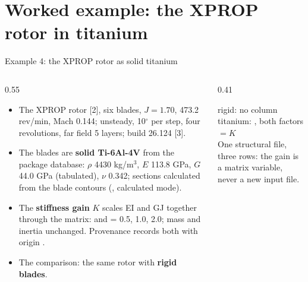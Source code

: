 %
%
%
%

\section{Worked example: the XPROP rotor in titanium}

\begin{frame}{Example 4: the XPROP rotor as solid titanium}
\begin{columns}[T]
\begin{column}{0.55\textwidth}
\begin{itemize}\scriptsize
  \item The XPROP rotor [2], six blades, \(J = 1.70\), 473.2 rev/min,
        Mach 0.144; unsteady, 10\(^\circ\) per step, four revolutions, far field
        5 layers; build 26.124 [3].
  \item The blades are \textbf{solid Ti-6Al-4V} from the package database:
        \(\rho\) 4430 kg/m\(^3\), \(E\) 113.8 GPa, \(G\) 44.0 GPa (tabulated),
        \(\nu\) 0.342; sections calculated from the blade contours
        (, calculated mode).
  \item The \textbf{stiffness gain} \(K\) scales EI and GJ together through the
        matrix:  and
         = 0.5, 1.0, 2.0; mass and
        inertia unchanged. Provenance records both with origin .
  \item The comparison: the same rotor with \textbf{rigid blades}.
\end{itemize}
\end{column}
\begin{column}{0.41\textwidth}
\begin{ftsevidence}
\scriptsize
rigid: no  column\\
titanium: , both factors \(= K\)\\[2pt]
One structural file, three rows: the gain is a matrix variable, never a new
input file.
\end{ftsevidence}
\end{column}
\end{columns}
\end{frame}


